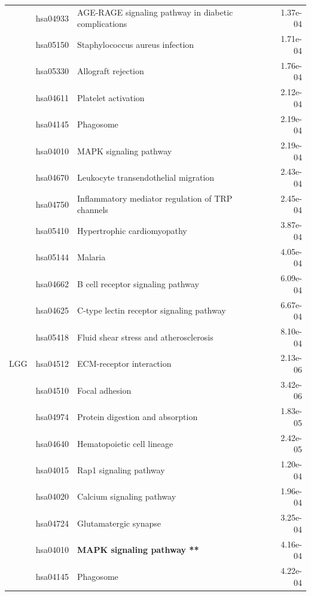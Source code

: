 \begin{longtable}{cllr}
 & hsa04933 & \textcolor{\clrnew}{AGE-RAGE signaling pathway in diabetic complications} & 1.37e-04 \\ 
 & hsa05150 & \textcolor{\clrnew}{Staphylococcus aureus infection} & 1.71e-04 \\ 
 & hsa05330 & \textcolor{\clrnew}{Allograft rejection} & 1.76e-04 \\ 
 & hsa04611 & \textcolor{\clrnew}{Platelet activation} & 2.12e-04 \\ 
 & hsa04145 & \textcolor{\clrnew}{Phagosome} & 2.19e-04 \\ 
 & hsa04010 & \textcolor{\clrnew}{MAPK signaling pathway} & 2.19e-04 \\ 
 & hsa04670 & \textcolor{\clrnew}{Leukocyte transendothelial migration} & 2.43e-04 \\ 
 & hsa04750 & \textcolor{\clrnew}{Inflammatory mediator regulation of TRP channels} & 2.45e-04 \\ 
 & hsa05410 & \textcolor{\clrnew}{Hypertrophic cardiomyopathy} & 3.87e-04 \\ 
 & hsa05144 & \textcolor{\clrnew}{Malaria} & 4.05e-04 \\ 
 & hsa04662 & \textcolor{\clrnew}{B cell receptor signaling pathway} & 6.09e-04 \\ 
 & hsa04625 & \textcolor{\clrnew}{C-type lectin receptor signaling pathway} & 6.67e-04 \\ 
 & hsa05418 & \textcolor{\clrnew}{Fluid shear stress and atherosclerosis} & 8.10e-04 \\ 
\midrule 
LGG & hsa04512 & \textcolor{\clrnew}{ECM-receptor interaction} & 2.13e-06\\ 
 & hsa04510 & \textcolor{\clrnew}{Focal adhesion} & 3.42e-06 \\ 
 & hsa04974 & \textcolor{\clrnew}{Protein digestion and absorption} & 1.83e-05 \\ 
 & hsa04640 & \textcolor{\clrnew}{Hematopoietic cell lineage} & 2.42e-05 \\ 
 & hsa04015 & \textcolor{\clrnew}{Rap1 signaling pathway} & 1.20e-04 \\ 
 & hsa04020 & \textcolor{\clrnew}{Calcium signaling pathway} & 1.96e-04 \\ 
 & hsa04724 & \textcolor{\clrnew}{Glutamatergic synapse} & 3.25e-04 \\ 
 \rowcolor{\clrpath}& hsa04010 & \textbf{MAPK signaling pathway **} & 4.16e-04 \\ 
 & hsa04145 & \textcolor{\clrnew}{Phagosome} & 4.22e-04 \\ 

\end{longtable}
